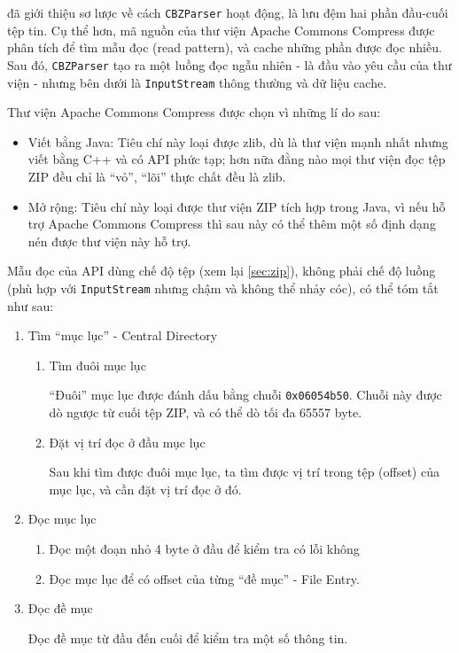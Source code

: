 \documentclass[../../thesis]{subfiles}
\begin{document}
 đã giới thiệu sơ lược về cách \texttt{CBZParser} hoạt
động, là lưu đệm hai phần đầu-cuối tệp tin. Cụ thể hơn, mã nguồn của thư viện
Apache Commons Compress được phân tích để tìm mẫu đọc (read pattern), và cache
những phần được đọc nhiều. Sau đó, \texttt{CBZParser} tạo ra một luồng đọc ngẫu
nhiên - là đầu vào yêu cầu của thư viện - nhưng bên dưới là \texttt{InputStream}
thông thường và dữ liệu cache.

Thư viện Apache Commons Compress được chọn vì những lí do sau:

\begin{itemize}
    \item
        Viết bằng Java: Tiêu chí này loại được zlib, dù là thư viện mạnh nhất
        nhưng viết bằng C++ và có API phức tạp; hơn nữa đằng nào mọi thư viện
        đọc tệp ZIP đều chỉ là ``vỏ'', ``lõi'' thực chất đều là zlib.
    \item
        Mở rộng: Tiêu chí này loại được thư viện ZIP tích hợp trong Java, vì nếu
        hỗ trợ Apache Commons Compress thì sau này có thể thêm một số định dạng
        nén được thư viện này hỗ trợ.
\end{itemize}

Mẫu đọc của API dùng chế độ tệp (xem lại \autoref{sec:zip}), không phải chế độ
luồng (phù hợp với \texttt{InputStream} nhưng chậm và không thể nhảy cóc), có
thể tóm tắt như sau:

\begin{enumerate}
    \item
        Tìm ``mục lục'' - Central Directory

        \begin{enumerate}
            \item
                Tìm đuôi mục lục

                ``Đuôi'' mục lục được đánh dấu bằng chuỗi \texttt{0x06054b50}.
                Chuỗi này được dò ngược từ cuối tệp ZIP, và có thể dò tối đa
                65557 byte.
            \item
                Đặt vị trí đọc ở đầu mục lục

                Sau khi tìm được đuôi mục lục, ta tìm được vị trí trong tệp
                (offset) của mục lục, và cần đặt vị trí đọc ở đó.
        \end{enumerate}
    \item
        Đọc mục lục

        \begin{enumerate}
            \item
                Đọc một đoạn nhỏ 4 byte ở đầu để kiểm tra có lỗi không
            \item
                Đọc mục lục để có offset của từng ``đề mục'' - File Entry.
        \end{enumerate}
    \item
        Đọc đề mục

        Đọc đề mục từ đầu đến cuối để kiểm tra một số thông tin.
\end{enumerate}
\end{document}
